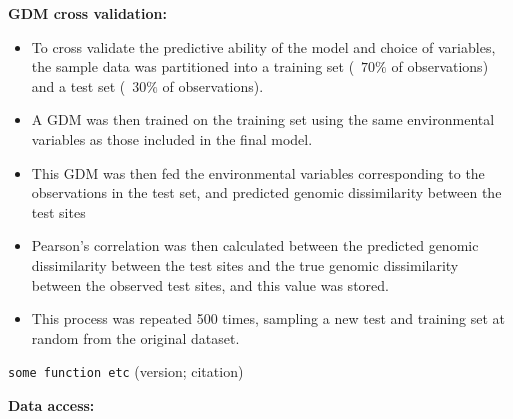 \textbf{GDM cross validation:}
\begin{itemize}
\item To cross validate the predictive ability of the model and choice of variables, the sample data was partitioned into a training set (~$70\%$ of observations) and a test set (~$30\%$ of observations).
\item A GDM was then trained on the training set using the same environmental variables as those included in the final model.
\item This GDM was then fed the environmental variables corresponding to the observations in the test set, and predicted genomic dissimilarity between the test sites
\item Pearson's correlation was then calculated between the predicted genomic dissimilarity between the test sites and the true genomic dissimilarity between the observed test sites, and this value was stored.
\item This process was repeated 500 times, sampling a new test and training set at random from the original dataset.
\end{itemize}

\texttt{some function etc} (version; citation)

\textbf{Data access:}
